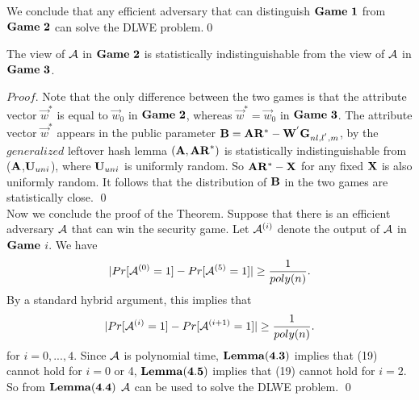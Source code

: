 We conclude that any efficient adversary that can distinguish $\mathbf{Game\ 1}$ from $\mathbf{Game\ 2}$ can solve the DLWE problem.\qed
\begin{lemma}
The view of $\mathcal{A}$ in $\mathbf{Game\ 2}$ is statistically indistinguishable from the view of $\mathcal{A}$ in $\mathbf{Game\ 3}$.
\end{lemma}
\noindent $Proof$. Note that the only difference between the two games is that the attribute vector $\vec{w}^{*}$ is equal to $\vec{w}_{0}$ in $\mathbf{Game\ 2}$, whereas $\vec{w}^{*}=\vec{w}_{0}$ in $\mathbf{Game\ 3}$. The attribute vector $\vec{w}^{*}$ appears in the public parameter $\mathbf{B}=\mathbf{A}\mathbf{R}^{*}-\mathbf{W}^{'}\mathbf{G}_{nl,l^{'},m}$, by the $generalized$ leftover hash lemma $(\mathbf{A},\mathbf{AR}^{*})$ is statistically indistinguishable from ($\mathbf{A}$,$\mathbf{U}_{uni}$), where $\mathbf{U}_{uni}$ is uniformly random. So $\mathbf{A}\mathbf{R}^{*}-\mathbf{X}$ for any fixed $\mathbf{X}$ is also uniformly random. It follows that the distribution of $\mathbf{B}$ in the two games are statistically close. \qed \\[0.3cm]
Now we conclude the proof of the Theorem. Suppose that there is an efficient adversary $\mathcal{A}$ that can win the security game. Let $\mathcal{A}^{(i)}$ denote the output of $\mathcal{A}$ in $\mathbf{Game}$ $i$. We have
\begin{equation}
|Pr[\mathcal{A}^{(0)}=1]-Pr[\mathcal{A}^{(5)}=1]|\geq\frac{1}{poly(n)}.
\end{equation}
By a standard hybrid argument, this implies that
\begin{equation}
|Pr[\mathcal{A}^{(i)}=1]-Pr[\mathcal{A}^{(i+1)}=1]|\geq\frac{1}{poly(n)}.
\end{equation}
for $i=0,...,4$. Since $\mathcal{A}$ is polynomial time, $\mathbf{Lemma(4.3)}$ implies that (19) cannot hold for $i=0$ or 4, $\mathbf{Lemma(4.5)}$ implies that (19) cannot hold for $i=2$. So from $\mathbf{Lemma(4.4)}$ $\mathcal{A}$ can be used to solve the DLWE problem. \qed


